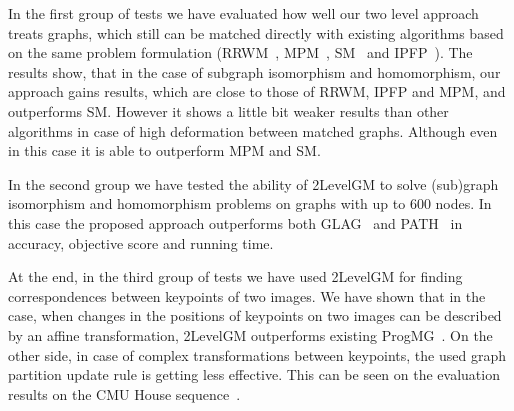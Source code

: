 In the first group of tests we have evaluated how well our two level approach treats graphs, which still can be matched directly with existing algorithms based on the same problem formulation (RRWM~\cite{Cho2010_RRWM}, MPM~\cite{Cho2014_Haystack}, SM~\cite{Leordeanu2005_SM} and IPFP~\cite{Leordeanu2009_IPFP}). The results show, that in the case of subgraph isomorphism and homomorphism, our approach gains results, which are close to those of RRWM, IPFP and MPM, and outperforms SM. However it shows a little bit weaker results than other algorithms in case of high deformation between matched graphs. Although even in this case it is able to outperform MPM and SM.

In the second group we have tested the ability of 2LevelGM to solve (sub)graph isomorphism and homomorphism problems on graphs with up to $600$ nodes. In this case the proposed approach outperforms both GLAG~\cite{Fiori2013_GLAG} and PATH~\cite{Zazlavskiy2008_PATH} in accuracy, objective score and running time.

At the end, in the third group of tests we have used 2LevelGM for finding correspondences between keypoints of two images. We have shown that in the case, when changes in the positions of keypoints on two images can be described by an affine transformation, 2LevelGM outperforms existing ProgMG~\cite{Cho2012_ProgressiveGM}. On the other side, in case of complex transformations between keypoints, the used graph partition update rule is getting less effective. This can be seen on the evaluation results on the CMU House sequence~\cite{CMUHouse}.%

